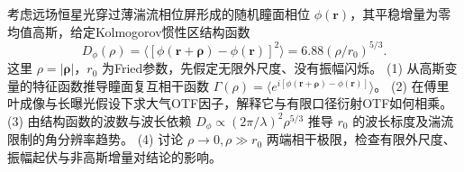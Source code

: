 考虑远场恒星光穿过薄湍流相位屏形成的随机瞳面相位 \(\phi(\boldsymbol r)\)，其平稳增量为零均值高斯，给定Kolmogorov惯性区结构函数
\[
D_\phi(\rho)=\langle[\phi(\boldsymbol r+\boldsymbol\rho)-\phi(\boldsymbol r)]^2\rangle
=6.88(\rho/r_0)^{5/3}.
\]
这里 \(\rho=|\boldsymbol\rho|\)，\(r_0\) 为Fried参数，先假定无限外尺度、没有振幅闪烁。
(1) 从高斯变量的特征函数推导瞳面复互相干函数 \(\Gamma(\rho)=\langle e^{i[\phi(\boldsymbol r+\boldsymbol\rho)-\phi(\boldsymbol r)]}\rangle\)。
(2) 在傅里叶成像与长曝光假设下求大气OTF因子，解释它与有限口径衍射OTF如何相乘。
(3) 由结构函数的波数与波长依赖 \(D_\phi\propto (2\pi/\lambda)^2\rho^{5/3}\) 推导 \(r_0\) 的波长标度及湍流限制的角分辨率趋势。
(4) 讨论 \(\rho\to0,\rho\gg r_0\) 两端相干极限，检查有限外尺度、振幅起伏与非高斯增量对结论的影响。
